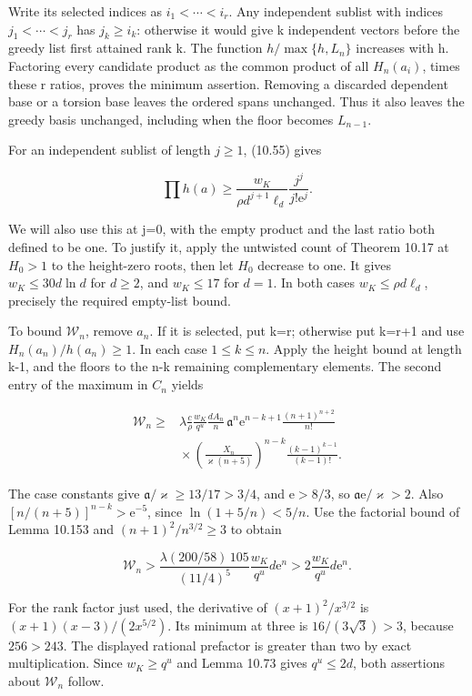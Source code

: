 \documentclass[
  11pt,
  a4paper,
]{article}
\begin{document}
Write its selected indices as \(i_1<\cdots<i_r\). Any independent
sublist with indices \(j_1<\cdots<j_r\) has \(j_k\ge i_k\): otherwise it
would give k independent vectors before the greedy list first attained
rank k. The function \(h/\max\{h,L_n\}\) increases with h. Factoring
every candidate product as the common product of all \(H_n(a_i)\), times
these r ratios, proves the minimum assertion. Removing a discarded
dependent base or a torsion base leaves the ordered spans unchanged.
Thus it also leaves the greedy basis unchanged, including when the floor
becomes \(L_{n-1}\).

For an independent sublist of length \(j\ge1\), (10.55) gives

\[
\prod h(a)\ge\frac{w_K}{\rho d^{j+1}\ell_d}
              \frac{j^j}{j!\mathrm e^j}.
\tag{10.475}
\]

We will also use this at j=0, with the empty product and the last ratio
both defined to be one. To justify it, apply the untwisted count of
Theorem 10.17 at \(H_0>1\) to the height-zero roots, then let \(H_0\)
decrease to one. It gives \(w_K\le30d\ln d\) for \(d\ge2\), and
\(w_K\le17\) for \(d=1\). In both cases \(w_K\le\rho d\ell_d\),
precisely the required empty-list bound.

To bound \(\mathcal W_n\), remove \(a_n\). If it is selected, put k=r;
otherwise put k=r+1 and use \(H_n(a_n)/h(a_n)\ge1\). In each case
\(1\le k\le n\). Apply the height bound at length k-1, and the floors to
the n-k remaining complementary elements. The second entry of the
maximum in \(C_n\) yields

\[
\begin{aligned}
\mathcal W_n\ge{}&\lambda\frac c\rho\frac{w_K}{q^u}
\frac{dA_n}{n}\,
\mathfrak a^n\mathrm e^{n-k+1}
\frac{(n+1)^{n+2}}{n!}\\
&{}\times\left(\frac{X_n}{\varkappa(n+5)}\right)^{n-k}
\frac{(k-1)^{k-1}}{(k-1)!}.
\end{aligned}
\tag{10.476}
\]

The case constants give \(\mathfrak a/\varkappa\ge13/17>3/4\), and
\(\mathrm e>8/3\), so \(\mathfrak a\mathrm e/\varkappa>2\). Also
\([n/(n+5)]^{n-k}>\mathrm e^{-5}\), since \(\ln(1+5/n)<5/n\). Use the
factorial bound of Lemma 10.153 and \((n+1)^2/n^{3/2}\ge3\) to obtain

\[
\mathcal W_n>
\frac{\lambda(200/58)\,105}{(11/4)^5}
\frac{w_K}{q^u}d\mathrm e^n
>2\frac{w_K}{q^u}d\mathrm e^n.
\tag{10.477}
\]

For the rank factor just used, the derivative of \((x+1)^2/x^{3/2}\) is
\((x+1)(x-3)/(2x^{5/2})\). Its minimum at three is \(16/(3\sqrt3)>3\),
because \(256>243\). The displayed rational prefactor is greater than
two by exact multiplication. Since \(w_K\ge q^u\) and Lemma 10.73 gives
\(q^u\le2d\), both assertions about \(\mathcal W_n\) follow.
\end{document}
